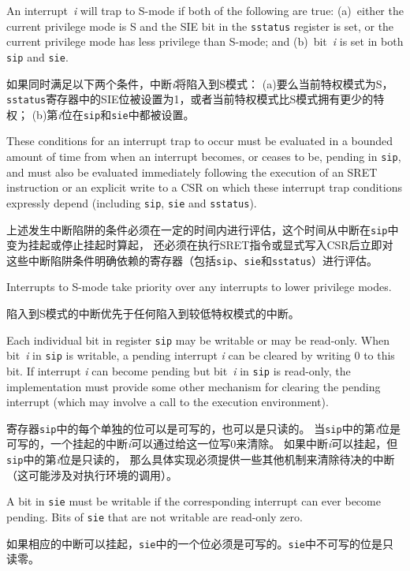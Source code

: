 An interrupt~\textit{i} will trap to S-mode if both of the
following are true:
(a)~either the current privilege mode is S and the SIE bit in the
{\tt sstatus} register is set, or the current privilege mode has less
privilege than S-mode; and
(b)~bit~\textit{i} is set in both {\tt sip} and {\tt sie}.

如果同时满足以下两个条件，中断\textit{i}将陷入到S模式： 
(a)要么当前特权模式为S，{\tt sstatus}寄存器中的SIE位被设置为1，或者当前特权模式比S模式拥有更少的特权；
(b)第\textit{i}位在{\tt sip}和{\tt sie}中都被设置。

These conditions for an interrupt trap to occur must be evaluated in a bounded
amount of time from when an interrupt becomes, or ceases to be,
pending in {\tt sip}, and must
also be evaluated immediately following the execution of an SRET instruction
or an explicit write to a CSR on which these interrupt trap conditions
expressly depend (including {\tt sip}, {\tt sie} and {\tt sstatus}).

上述发生中断陷阱的条件必须在一定的时间内进行评估，这个时间从中断在{\tt sip}中变为挂起或停止挂起时算起，
还必须在执行SRET指令或显式写入CSR后立即对这些中断陷阱条件明确依赖的寄存器（包括{\tt sip}、{\tt sie}和{\tt sstatus}）进行评估。

Interrupts to S-mode take priority over any interrupts to lower privilege
modes.

陷入到S模式的中断优先于任何陷入到较低特权模式的中断。

Each individual bit in register {\tt sip} may be writable or may be
read-only.
When bit~\textit{i} in {\tt sip} is writable, a pending interrupt
\textit{i} can be cleared by writing 0 to this bit.
If interrupt \textit{i} can become pending but bit~\textit{i} in
{\tt sip} is read-only, the implementation must provide some other
mechanism for clearing the pending interrupt (which may involve a call to
the execution environment).

寄存器{\tt sip}中的每个单独的位可以是可写的，也可以是只读的。
当{\tt sip}中的第\textit{i}位是可写的，一个挂起的中断\textit{i}可以通过给这一位写0来清除。
如果中断\textit{i}可以挂起，但{\tt sip}中的第\textit{i}位是只读的，
那么具体实现必须提供一些其他机制来清除待决的中断（这可能涉及对执行环境的调用）。

A bit in {\tt sie} must be writable if the corresponding interrupt can
ever become pending.
Bits of {\tt sie} that are not writable are read-only zero.

如果相应的中断可以挂起，{\tt sie}中的一个位必须是可写的。{\tt sie}中不可写的位是只读零。

